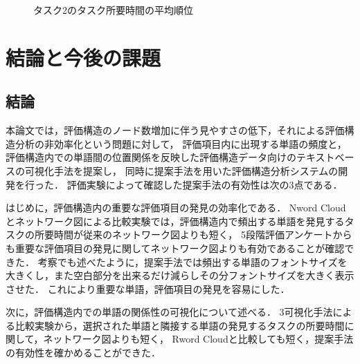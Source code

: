 \documentclass[syuuron]{kuee}
\begin{document}
		\begin{figure}
			\begin{center}
			\end{center}
			\caption{タスク2のタスク所要時間の平均順位}
	  		\label{fig:res10}
		\end{figure}

\chapter{結論と今後の課題}
	\section{結論}
		本論文では，評価構造のノード数増加に伴う見やすさの低下，それによる評価構造分析の非効率化という問題に対して，
		評価項目内に出現する単語の頻度と，評価構造内での単語間の位置関係を反映した評価構造データ向けのテキストベースの可視化手法を提案し，
		同時に提案手法を用いた評価構造分析システムの開発を行った．
		評価実験によって確認した提案手法の有効性は次の3点である．
		
		はじめに，評価構造内の重要な評価項目の発見の効率化である．
		Nword Cloudとネットワーク図による比較実験では，評価構造内で頻出する単語を発見するタスクの所要時間が従来のネットワーク図よりも短く，
		5段階評価アンケートからも重要な評価項目の発見に関してネットワーク図よりも有効であることが確認できた．
		考察でも述べたように，提案手法では頻出する単語のフォントサイズを大きくし，また空白部分を出来るだけ減らしその分フォントサイズを大きく表示させた．
		これにより重要な単語，評価項目の発見を容易にした．
		
		次に，評価構造内での単語の関係性の可視化について述べる．
		3可視化手法による比較実験から，選択された単語と隣接する単語の発見するタスクの所要時間に関して，ネットワーク図よりも短く，
		Rword Cloudと比較しても短く，提案手法の有効性を確かめることができた．
		
\end{document}
